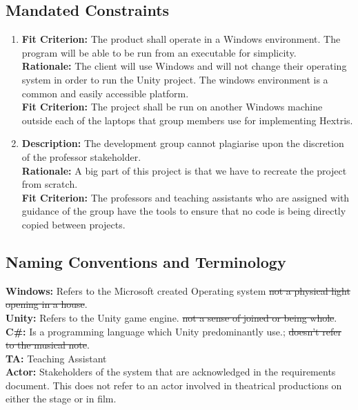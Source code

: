 \documentclass[12pt, titlepage]{article}
\begin{document}
\subsection{Mandated Constraints}
\begin{enumerate}[label=C\arabic*]
\item \textbf{Fit Criterion:} The product shall operate in a Windows environment. {\color{blue}The program will be able to be run from an executable for simplicity.} \\
\textbf{Rationale:} The client will use Windows and will not change their operating system in order to run the Unity project. The windows environment is a common and easily accessible platform.\\
\textbf{Fit Criterion:} The project shall be run on another Windows machine outside each of the laptops that group members use for implementing Hextris. 

\newpage

\item \textbf{Description:} The development group cannot plagiarise upon the discretion of the professor stakeholder. \\
\textbf{Rationale:} A big part of this project is that we have to recreate the project from scratch. \\
\textbf{Fit Criterion:} The professors and teaching assistants who are assigned with guidance of the group have the tools to ensure that no code is being directly copied between projects. 
\end{enumerate}



\subsection{Naming Conventions and Terminology}
\noindent \textbf{Windows:} Refers to the Microsoft created Operating system \sout{not a physical light opening in a house}.\\
\textbf{Unity:} Refers to the Unity game engine. \sout{not a sense of joined or being whole}.\\
\textbf{C\#:} Is a programming language which Unity predominantly use.; \sout{doesn't refer to the musical note}.\\
\textbf{TA:} Teaching Assistant\\
\textbf{Actor:} Stakeholders of the system that are acknowledged in the requirements document. This does not refer to an actor involved in theatrical productions on either the stage or in film.\\
\end{document}
